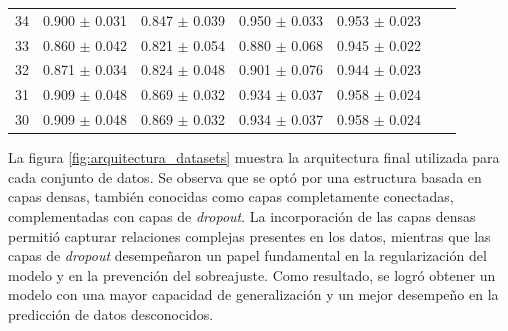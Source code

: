 \begin{table}[H]
\begin{tabular}{l c c c c c c}
      34 & 0.900 $\pm$ 0.031 & 0.847 $\pm$ 0.039	& 0.950 $\pm$ 0.033 & 0.953  $\pm$ 0.023\\
      33 & 0.860 $\pm$ 0.042 & 0.821 $\pm$ 0.054	& 0.880 $\pm$ 0.068 & 0.945  $\pm$ 0.022\\
      32 & 0.871 $\pm$ 0.034 & 0.824 $\pm$ 0.048	& 0.901 $\pm$ 0.076 & 0.944  $\pm$ 0.023\\
      31 & 0.909 $\pm$ 0.048 & 0.869 $\pm$ 0.032	& 0.934 $\pm$ 0.037 & 0.958  $\pm$ 0.024\\
      30 & 0.909 $\pm$ 0.048 & 0.869 $\pm$ 0.032	& 0.934 $\pm$ 0.037 & 0.958  $\pm$ 0.024\\

		\bottomrule
		\hline
	\end{tabular}
	\label{tab:tablamodelos_1layers}
\end{table}


La figura \ref{fig:arquitectura_datasets} muestra la arquitectura final utilizada para cada conjunto de datos. 
Se observa que se optó por una estructura basada en capas densas, también conocidas como capas 
completamente conectadas, complementadas con capas de \emph{dropout}. La incorporación de las capas 
densas permitió capturar relaciones complejas presentes en los datos, mientras que las capas de 
\emph{dropout} desempeñaron un papel fundamental en la regularización del modelo y en la prevención 
del sobreajuste. Como resultado, se logró obtener un modelo con una mayor capacidad de generalización 
y un mejor desempeño en la predicción de datos desconocidos.


